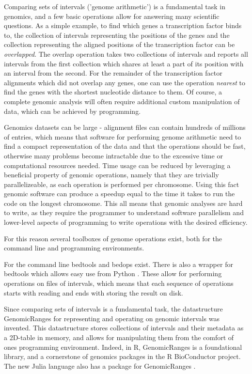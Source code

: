 \documentclass[10pt,letterpaper]{article}
\begin{document}
Comparing sets of intervals ('genome arithmetic') is a fundamental task in
genomics, and a few basic operations allow for answering many scientific
questions. As a simple example, to find which genes a transcription factor binds
to, the collection of intervals representing the positions of the genes and the
collection representing the aligned positions of the transcription factor can be
\textit{overlapped}. The overlap operation takes two collections of intervals
and reports all intervals from the first collection which shares at least a part
of its position with an interval from the second. For the remainder of the
transcription factor alignments which did not overlap any genes, one can use the
operation \textit{nearest} to find the genes with the shortest nucleotide
distance to them. Of course, a complete genomic analysis will often require
additional custom manipulation of data, which can be achieved by programming.

Genomics datasets can be large - alignment files can contain hundreds of
millions of entries, which means that software for performing genome arithmetic
need to find a compact representation of the data and that the operations should
be fast, otherwise many problems become intractable due to the excessive time or
computational resources needed. Time usage can be reduced by leveraging a
beneficial property of genomic operations, namely that they are trivially
parallelizeable, as each operation is performed per chromosome. Using this fact
genomic software can produce a speedup equal to the time it takes to run the
code on the longest chromosome. This all means that genomic analyses are hard to
write, as they require the programmer to understand software parallelism and
lower-level aspects of programming to write operations with the desired
efficiency.

For this reason several toolboxes of genome operations exist, both for the
command line and programming environments.

For the command line bedtools \cite{doi:10.1093/bioinformatics/btq033} and
bedops \cite{doi:10.1093/bioinformatics/bts277} exist. There is also a wrapper
for bedtools which allows easy use from Python
\cite{doi:10.1093/bioinformatics/btr539}. These allow for performing operations
on files of intervals, which means that each sequence of operations starts with
reading and ends with storing the result on disk.

Since comparing sets of intervals is a fundamental task, the datastructure
GenomicRanges\cite{10.1371/journal.pcbi.1003118} for representing and operating
on genomic intervals was invented. This datastructure stores collections of
intervals and their metadata as a 2D-table in memory, and allows for
manipulating them from the comfort of ones programming environment. Indeed, in
R, GenomicRanges is a foundational library, and a cornerstone of genomics
packages in the R BioConductor \cite{Gentleman2004} project. The new Julia
language \cite{doi:10.1137/141000671} also has a package for GenomicRanges
\cite{Haverty2017}.
\end{document}
